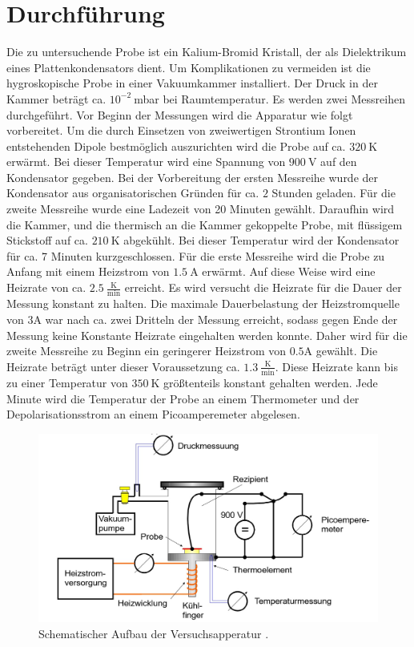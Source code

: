 \section{Durchführung}
\label{sec:Durchführung}
Die zu untersuchende Probe ist ein Kalium-Bromid Kristall, der als Dielektrikum eines Plattenkondensators dient. 
Um Komplikationen zu vermeiden ist die hygroskopische Probe in einer Vakuumkammer installiert.
Der Druck in der Kammer beträgt ca. $10^{-2}~$mbar bei Raumtemperatur.
Es werden zwei Messreihen durchgeführt. 
Vor Beginn der Messungen wird die Apparatur wie folgt vorbereitet. 
Um die durch Einsetzen von zweiwertigen Strontium Ionen entstehenden Dipole bestmöglich auszurichten wird die Probe auf ca. $320~$K erwärmt. Bei dieser Temperatur wird eine Spannung von $900~$V auf den Kondensator gegeben. 
Bei der Vorbereitung der ersten Messreihe wurde der Kondensator aus organisatorischen Gründen für ca. $2$ Stunden geladen.
Für die zweite Messreihe wurde eine Ladezeit von 20 Minuten gewählt.
Daraufhin wird die Kammer, und die thermisch an die Kammer gekoppelte Probe, mit flüssigem Stickstoff auf ca. $210~$K abgekühlt. 
Bei dieser Temperatur wird der Kondensator für ca. 7 Minuten kurzgeschlossen.
Für die erste Messreihe wird die Probe zu Anfang mit einem Heizstrom von $1.5~$A erwärmt. 
Auf diese Weise wird eine Heizrate von ca. $2.5 ~\frac{\text{K}}{\text{min}}$ erreicht. 
Es wird versucht die Heizrate für die Dauer der Messung konstant zu halten.
Die maximale Dauerbelastung der Heizstromquelle von $3$A war nach ca. zwei Dritteln der Messung erreicht, sodass gegen Ende der Messung keine Konstante Heizrate eingehalten werden konnte.
Daher wird für die zweite Messreihe zu Beginn ein geringerer Heizstrom von $0.5$A gewählt. 
Die Heizrate beträgt unter dieser Voraussetzung ca. $1.3~ \frac{\text{K}}{\text{min}}$.
Diese Heizrate kann bis zu einer Temperatur von $350~$K größtenteils konstant gehalten werden.
Jede Minute wird die Temperatur der Probe an einem Thermometer und der Depolarisationsstrom an einem Picoamperemeter abgelesen.
\begin{figure}
\centering
\includegraphics[scale=0.5]{content/aufbau.jpg}
\caption{Schematischer Aufbau der Versuchsapperatur \cite{Anleitung}.}
\label{fig:Aufbau}
\end{figure}